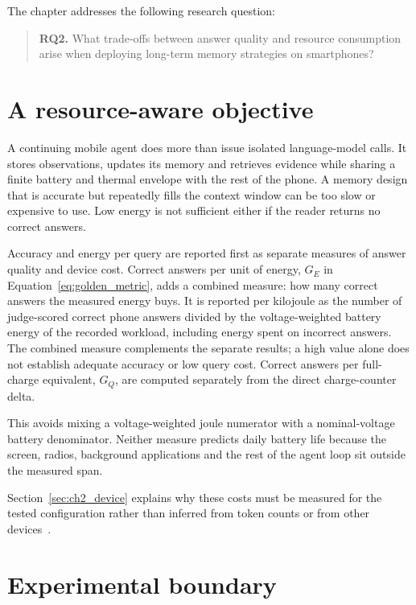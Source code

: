 The chapter addresses the following research question:

\begin{quote}
\textbf{RQ2.} What trade-offs between answer quality and resource consumption arise when
deploying long-term memory strategies on smartphones?
\end{quote}

\section{A resource-aware objective}
\label{sec:ch5_objective}

A continuing mobile agent does more than issue isolated language-model calls. It stores
observations, updates its memory and retrieves evidence while sharing a finite battery
and thermal envelope with the rest of the phone. A memory design that is accurate but
repeatedly fills the context window can be too slow or expensive to use. Low energy is
not sufficient either if the reader returns no correct answers.

Accuracy and energy per query are reported first as separate measures of answer quality and device
cost. Correct answers per unit of energy, $G_E$ in Equation~\ref{eq:golden_metric}, adds a combined
measure: how many correct answers the measured energy buys. It is reported per kilojoule as the
number of judge-scored correct phone answers divided by the voltage-weighted battery energy of the
recorded workload, including energy spent on incorrect answers. The combined measure complements
the separate results; a high value alone does not establish adequate accuracy or low query cost.
Correct answers per full-charge equivalent, $G_Q$, are computed separately from the direct
charge-counter delta.

This avoids mixing a voltage-weighted joule numerator with a nominal-voltage battery
denominator. Neither measure predicts daily battery life because the screen, radios,
background applications and the rest of the agent loop sit outside the measured span.

Section~\ref{sec:ch2_device} explains why these costs must be measured for the tested
configuration rather than inferred from token counts or from other
devices~\citep{slm_edge_deployment,ondevice_lm_review}.

\section{Experimental boundary}
\label{sec:ch5_boundary}

